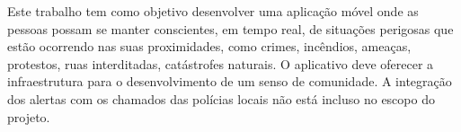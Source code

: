 

Este trabalho tem como objetivo desenvolver uma aplicação móvel onde as pessoas possam se manter conscientes, em tempo real, de situações perigosas que estão ocorrendo nas suas proximidades, como crimes, incêndios, ameaças, protestos, ruas interditadas, catástrofes naturais. O aplicativo deve oferecer a infraestrutura para o desenvolvimento de um senso de comunidade. A integração dos alertas com os chamados das polícias locais não está incluso no escopo do projeto.
